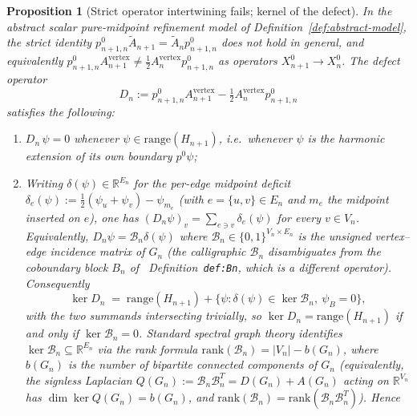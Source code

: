 \documentclass[11pt]{article}
\theoremstyle{plain}
\newtheorem{proposition}[theorem]{Proposition}
\theoremstyle{definition}
\theoremstyle{remark}
\newcommand{\R}{\mathbb{R}}
\begin{document}
\begin{proposition}[Strict operator intertwining fails; kernel of the defect]\label{prop:strict-fails}
In the abstract scalar pure-midpoint refinement model of
Definition~\ref{def:abstract-model}, the strict identity
$p^{0}_{n+1, n} \widetilde A_{n+1} = \widetilde A_n p^{0}_{n+1, n}$ does
not hold in general, and equivalently
$p^{0}_{n+1, n} A_{n+1}^{\mathrm{vertex}} \ne \tfrac12 A_n^{\mathrm{vertex}} p^{0}_{n+1, n}$
as operators $X_{n+1}^{0} \to X_n^{0}$. The defect operator
\begin{equation}\label{eq:defect}
   D_n := p^{0}_{n+1, n} A_{n+1}^{\mathrm{vertex}} - \tfrac12 A_n^{\mathrm{vertex}} p^{0}_{n+1, n}
\end{equation}
satisfies the following:
\begin{enumerate}[label=\textup{(\roman*)}, leftmargin=2.4em, nosep, topsep=2pt]
\item $D_n \,\psi = 0$ whenever $\psi \in \mathrm{range}(H_{n+1})$,
  i.e.\ whenever $\psi$ is the harmonic extension of its own
  boundary $p^{0} \psi$;
\item Writing $\delta(\psi) \in \R^{E_n}$ for the per-edge midpoint
  deficit
  $\delta_e(\psi) := \tfrac12(\psi_u + \psi_v) - \psi_{m_e}$
  (with $e = \{u, v\} \in E_n$ and $m_e$ the midpoint inserted on
  $e$), one has $(D_n \psi)_v = \sum_{e \ni v} \delta_e(\psi)$ for
  every $v \in V_n$. Equivalently, $D_n \psi = \mathcal{B}_n \delta(\psi)$
  where $\mathcal{B}_n \in \{0, 1\}^{V_n \times E_n}$ is the unsigned
  vertex--edge incidence matrix of $G_n$ (the calligraphic
  $\mathcal{B}_n$ disambiguates from the coboundary block $B_n$ of
  \cite{CascadeClosureDynamics}~Definition~\texttt{def:Bn}, which is
  a different operator). Consequently
  \begin{equation}\label{eq:kerDn}
     \ker D_n
     \;=\; \mathrm{range}(H_{n+1}) + \bigl\{\psi : \delta(\psi) \in \ker \mathcal{B}_n,\ \psi_B = 0\bigr\},
  \end{equation}
  with the two summands intersecting trivially, so
  $\ker D_n = \mathrm{range}(H_{n+1})$ if and only if
  $\ker \mathcal{B}_n = 0$. Standard spectral graph theory identifies
  $\ker \mathcal{B}_n \subseteq \R^{E_n}$ via the rank formula
  $\mathrm{rank}(\mathcal{B}_n) = |V_n| - b(G_n)$, where $b(G_n)$ is the number
  of bipartite connected components of $G_n$ (equivalently, the
  signless Laplacian $Q(G_n) := \mathcal{B}_n \mathcal{B}_n^{T} = D(G_n) + A(G_n)$ acting
  on $\R^{V_n}$ has $\dim \ker Q(G_n) = b(G_n)$, and
  $\mathrm{rank}(\mathcal{B}_n) = \mathrm{rank}(\mathcal{B}_n \mathcal{B}_n^{T})$). Hence

\end{enumerate}
\end{proposition}
\end{document}

